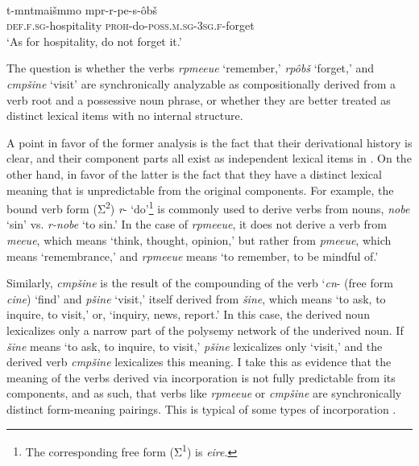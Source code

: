 \documentclass[output=paper]{LSP/langsci}
\begin{document}
\begin{exe}
\ex%
\label{05-gr-ex:41}
\\
\gll t-mntmaišmmo mpr-r-pe-s-ôbš\\
\textsc{def.f.sg-}hospitality \textsc{proh}-do-\textsc{poss.m.sg-3sg.f}-forget\\
\glt ‘As for hospitality, do not forget it.’  %
\end{exe}

The question is whether the verbs \textit{rpmeeue} ‘remember,’ \textit{rpôbš} ‘forget,’ and \textit{cmpšine} ‘visit’ are synchronically analyzable as compositionally derived from a verb root and a possessive noun phrase, or whether they are better treated as distinct lexical items with no internal structure.

A point in favor of the former analysis is the fact that their derivational history is clear, and their component parts all exist as independent lexical items in . On the other hand, in favor of the latter is the fact that they have a distinct lexical meaning that is unpredictable from the original components. For example, the bound verb form (Σ\textsuperscript{2}) \textit{r}- ‘do’\footnote{The corresponding free form (Σ\textsuperscript{1}) is \textit{eire}.} is commonly used to derive verbs from nouns, \eg \textit{nobe} ‘sin’ vs. \textit{r-nobe} ‘to sin.’ In the case of \textit{rpmeeue}, it does not derive a verb from \textit{meeue}, which means ‘think, thought, opinion,’ but rather from \textit{pmeeue}, which means ‘remembrance,’ and \textit{rpmeeue} means ‘to remember, to be mindful of.’

 Similarly, \textit{cmpšine} is the result of the compounding of the verb ‘\textit{cn}- (free form \textit{cine}) ‘find’ and \textit{pšine} ‘visit,’ itself derived from \textit{šine}, which means ‘to ask, to inquire, to visit,’ or, ‘inquiry, news, report.’ In this case, the derived noun lexicalizes only a narrow part of the polysemy network of the underived noun. If \textit{šine} means ‘to ask, to inquire, to visit,’ \textit{pšine} lexicalizes only ‘visit,’ and the derived verb \textit{cmpšine} lexicalizes this meaning. I take this as evidence that the meaning of the verbs derived via incorporation is not fully predictable from its components, and as such, that verbs like \textit{rpmeeue} or \textit{cmpšine} are synchronically distinct form-meaning pairings. This is typical of some types of incorporation \citep{Mithunetal1999Effect}.
\end{document}
